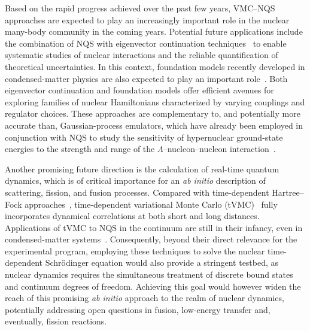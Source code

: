 Based on the rapid progress achieved over the past few years, VMC--NQS approaches are expected to play an increasingly important role in the nuclear many-body community in the coming years.
Potential future applications include the combination of NQS with eigenvector continuation techniques~\cite{frame_eigenvector_2018,duguet_colloquium_2024} to enable systematic studies of nuclear interactions and the reliable quantification of theoretical uncertainties. In this context, foundation models recently developed in condensed-matter physics are also expected to play an important role~\cite{rende_foundation_2025}. Both eigenvector continuation and foundation models offer efficient avenues for exploring families of nuclear Hamiltonians characterized by varying couplings and regulator choices. These approaches are complementary to, and potentially more accurate than, Gaussian-process emulators, which have already been employed in conjunction with NQS to study the sensitivity of hypernuclear ground-state energies to the strength and range of the $\Lambda$--nucleon--nucleon interaction~\cite{donna_hypernuclei_2025}.

Another promising future direction is the calculation of real-time quantum dynamics, which is of critical importance for an \emph{ab initio} description of scattering, fission, and fusion processes. Compared with time-dependent Hartree--Fock approaches~\cite{simenel_heavy-ion_2018}, time-dependent variational Monte Carlo (tVMC)~\cite{carleo_localization_2012} fully incorporates dynamical correlations at both short and long distances. Applications of tVMC to NQS in the continuum are still in their infancy, even in condensed-matter systems~\cite{nys_ab-initio_2024}. Consequently, beyond their direct relevance for the experimental program, employing these techniques to solve the nuclear time-dependent Schr\"odinger equation would also provide a stringent testbed, as nuclear dynamics requires the simultaneous treatment of discrete bound states and continuum degrees of freedom. Achieving this goal would however widen the reach of this promising \textit{ab initio} approach to the realm of nuclear dynamics, potentially addressing open questions in fusion, low-energy transfer and, eventually, fission reactions. 



